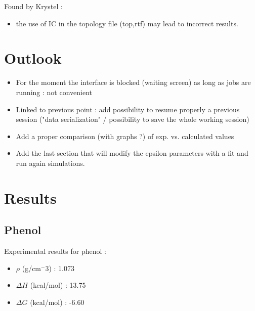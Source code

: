 \documentclass[12pt,a4paper]{article}
\begin{document}
Found by Krystel : 
\begin{itemize}
\item the use of IC in the topology file (top,rtf) may lead to incorrect results.
\end{itemize}


\section{Outlook}

\begin{itemize}
\item For the moment the interface is blocked (waiting screen) as long as jobs are
running : not convenient

\item Linked to previous point : add possibility to resume properly a previous
session ("data serialization" / possibility to save the whole working session)

\item Add a proper comparison (with graphs ?) of exp. vs. calculated values

\item Add the last section that will modify the epsilon parameters with a fit and run again 
simulations.
\end{itemize}



\section{Results}

\subsection{Phenol}

Experimental results for phenol :

\begin{itemize}
\item $\rho$ (g/cm$^-3$) : 1.073
\item $\Delta H$ (kcal/mol) : 13.75
\item $\Delta G$ (kcal/mol) : -6.60
\end{itemize}

\medskip
\end{document}
